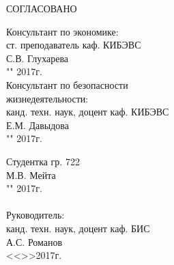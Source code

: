 СОГЛАСОВАНО
\vspace{0.01cm}
\begin{singlespace}
 \begin{minipage}[left]{0.40\linewidth}
 Консультант по экономике:\\
 ст. преподаватель каф. КИБЭВС \\
 \underline{\hspace{2.5cm}}С.В. Глухарева \\
 "\underline{\hspace{1cm}}"\underline{\hspace{3cm}} 2017г.\\

 Консультант по безопасности\\ жизнедеятельности:\\
 канд. техн. наук, доцент каф. КИБЭВС\\
 \underline{\hspace{2.5cm}}Е.М. Давыдова\\
 "\underline{\hspace{1cm}}"\underline{\hspace{3cm}} 2017г.\\
 \end{minipage}
 \hfill
 \begin{minipage}[left]{0.5\linewidth}
  \vspace{0.7cm}
  Студентка гр. 722 \\
  \underline{\hspace{3cm}}М.В. Мейта  \\
 "\underline{\hspace{1cm}}"\underline{\hspace{3cm}} 2017г.\\
 \vspace{0.3cm}\\ 
  Руководитель: \\
  канд. техн. наук, доцент каф. БИС \\
  \underline{\hspace{3cm}} А.С. Романов \\
  <<\underline{\hspace{1cm}}>>\underline{\hspace{3cm}}2017г.\\
 \end{minipage}
\end{singlespace}



